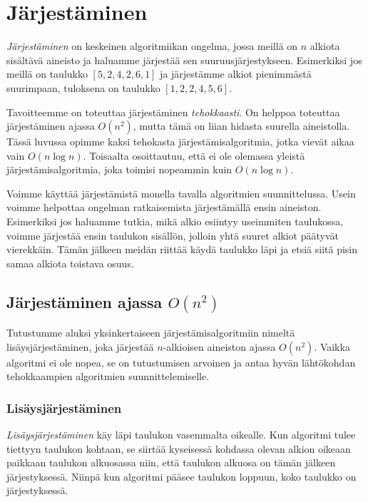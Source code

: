 \chapter{Järjestäminen}

\emph{Järjestäminen} on keskeinen algoritmiikan ongelma,
jossa meillä on $n$ alkiota sisältävä aineisto
ja haluamme järjestää sen suuruusjärjestykseen.
Esimerkiksi jos meillä on taulukko $[5,2,4,2,6,1]$ ja
järjestämme alkiot pienimmästä suurimpaan,
tuloksena on taulukko $[1,2,2,4,5,6]$.

Tavoitteemme on toteuttaa järjestäminen
\emph{tehokkaasti}.
On helppoa toteuttaa järjestäminen ajassa $O(n^2)$,
mutta tämä on liian hidasta suurella aineistolla.
Tässä luvussa opimme kaksi tehokasta
järjestämisalgoritmia, jotka vievät aikaa vain $O(n \log n)$.
Toisaalta osoittautuu, että ei ole olemassa
yleistä järjestämisalgoritmia, joka toimisi nopeammin
kuin $O(n \log n)$.

Voimme käyttää järjestämistä monella tavalla
algoritmien suunnittelussa.
Usein voimme helpottaa ongelman ratkaisemista
järjestämällä ensin aineiston.
Esimerkiksi jos haluamme tutkia,
mikä alkio esiintyy useimmiten taulukossa,
voimme järjestää ensin taulukon sisällön,
jolloin yhtä suuret alkiot päätyvät vierekkäin.
Tämän jälkeen meidän riittää käydä taulukko läpi
ja etsiä siitä pisin samaa alkiota toistava osuus.

\section{Järjestäminen ajassa $O(n^2)$}

Tutustumme aluksi yksinkertaiseen järjestämisalgoritmiin
nimeltä lisäysjär\-jestäminen,
joka järjestää $n$-alkioisen aineiston ajassa $O(n^2)$.
Vaikka algoritmi ei ole nopea, se on tutustumisen arvoinen
ja antaa hyvän lähtökohdan tehokkaampien algoritmien
suunnittelemiselle.

\subsection{Lisäysjärjestäminen}

\emph{Lisäysjärjestäminen} käy läpi taulukon
vasemmalta oikealle.
Kun algoritmi tulee tiettyyn taulukon kohtaan,
se siirtää kyseisessä kohdassa olevan alkion
oikeaan paikkaan taulukon
alkuosassa niin, että taulukon alkuosa
on tämän jälkeen järjestyksessä.
Niinpä kun algoritmi pääsee taulukon loppuun,
koko taulukko on järjestyksessä.

